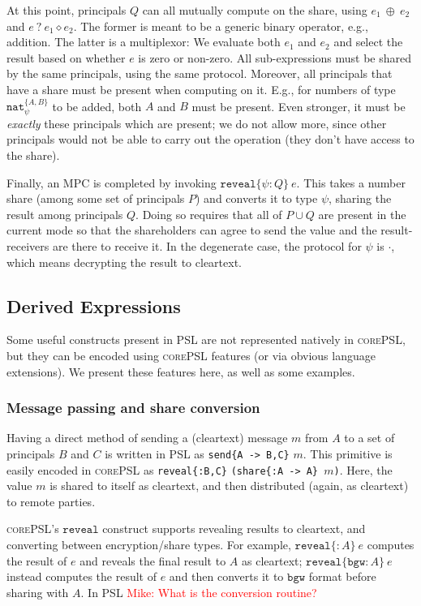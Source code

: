 \documentclass[10pt]{article}
\newcommand{\kw}[1]{\ensuremath{\mathtt{#1}}}
\newcommand{\tnat}{\ensuremath{\mathtt{nat}}}
\newcommand{\ebinop}[2]{\ensuremath{{#1}~\oplus~{#2}}}
\newcommand{\ereveal}[3]{\ensuremath{\kw{reveal}\{{#1}\!:\!{#2}\}~{#3}}}
\newcommand{\emux}[3]{\ensuremath{{#1}~\kw{?}~{#2} \diamond {#3}}}
\newcommand{\lang}{\textsc{corePSL}\xspace}
\newcommand{\mwh}[1]{\textcolor{red}{Mike: #1}}
\begin{document}
At this point, principals $Q$ can all mutually compute on the share,
using $\ebinop{e_1}{e_2}$ and $\emux{e}{e_1}{e_2}$. The former is
meant to be a generic binary operator, e.g., addition. The latter is a
multiplexor: We evaluate both $e_1$ and $e_2$ and select the result
based on whether $e$ is zero or non-zero. All sub-expressions must be
shared by the same principals, using the same protocol. Moreover, all
principals that have a share must be present when computing on
it. E.g., for numbers of type $\tnat^{\{A,B\}}_\psi$ to be added, both
$A$ and $B$ must be present. Even stronger, it must be \emph{exactly}
these principals which are present; we do not allow more, since other
principals would not be able to carry out the operation (they don't
have access to the share).

Finally, an MPC is completed by invoking $\ereveal{\psi}{Q}{e}$. This
takes a number share (among some set of principals $P$) and converts
it to type $\psi$, sharing the result among principals $Q$. Doing so
requires that all of $P \cup Q$ are present in the current mode so
that the shareholders can agree to send the value and the
result-receivers are there to receive it. In the degenerate case, the
protocol for $\psi$ is $\cdot$, which means decrypting the result to
cleartext. 

\subsection{Derived Expressions}
\label{sec:derived}

Some useful constructs present in PSL are not represented natively in
\lang, but they can be encoded using \lang features (or via
obvious language extensions). We present these features here, as well
as some examples.

\subsubsection{Message passing and share conversion}

Having a direct method of sending a (cleartext) message $m$ from $A$
to a set of principals $B$ and $C$ is written in PSL as \texttt{send\{A
    -> B,C\}} $m$. This primitive is easily encoded in \lang as
  \verb+reveal{:B,C}+ \verb+(share{:A -> A} +$m$\verb+)+.
Here, the value $m$ is shared to itself as cleartext, and then
distributed (again, as cleartext) to remote parties.

\lang's $\kw{reveal}$ construct supports revealing results to
cleartext, and converting between encryption/share types. For example,
$\ereveal{}{A}{e}$ computes the result of $e$ and reveals the final
result to $A$ as cleartext; $\ereveal{\kw{bgw}}{A}{e}$ instead
computes the result of $e$ and then converts it to $\kw{bgw}$ format
before sharing with $A$. In PSL \mwh{What is the conversion routine?}
\end{document}
